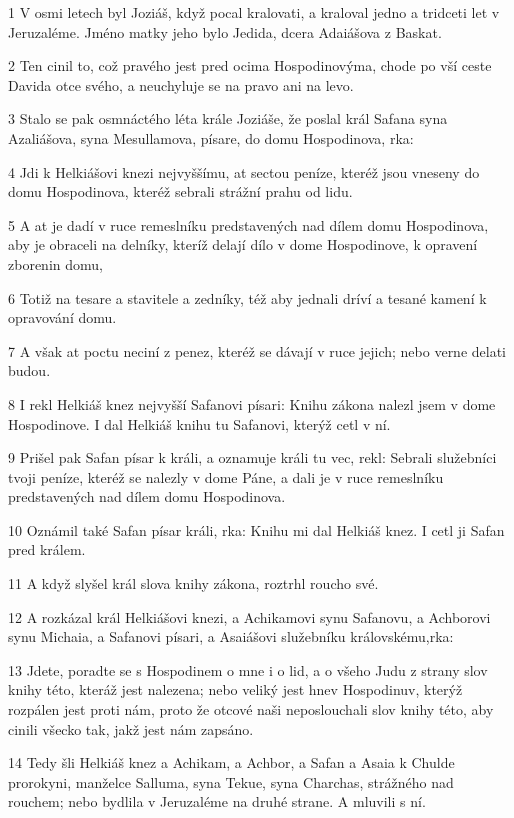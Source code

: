 \par 1 V osmi letech byl Joziáš, když pocal kralovati, a kraloval jedno a tridceti let v Jeruzaléme. Jméno matky jeho bylo Jedida, dcera Adaiášova z Baskat.
\par 2 Ten cinil to, což pravého jest pred ocima Hospodinovýma, chode po vší ceste Davida otce svého, a neuchyluje se na pravo ani na levo.
\par 3 Stalo se pak osmnáctého léta krále Joziáše, že poslal král Safana syna Azaliášova, syna Mesullamova, písare, do domu Hospodinova, rka:
\par 4 Jdi k Helkiášovi knezi nejvyššímu, at sectou peníze, kteréž jsou vneseny do domu Hospodinova, kteréž sebrali strážní prahu od lidu.
\par 5 A at je dadí v ruce remeslníku predstavených nad dílem domu Hospodinova, aby je obraceli na delníky, kteríž delají dílo v dome Hospodinove, k opravení zborenin domu,
\par 6 Totiž na tesare a stavitele a zedníky, též aby jednali dríví a tesané kamení k opravování domu.
\par 7 A však at poctu neciní z penez, kteréž se dávají v ruce jejich; nebo verne delati budou.
\par 8 I rekl Helkiáš knez nejvyšší Safanovi písari: Knihu zákona nalezl jsem v dome Hospodinove. I dal Helkiáš knihu tu Safanovi, kterýž cetl v ní.
\par 9 Prišel pak Safan písar k králi, a oznamuje králi tu vec, rekl: Sebrali služebníci tvoji peníze, kteréž se nalezly v dome Páne, a dali je v ruce remeslníku predstavených nad dílem domu Hospodinova.
\par 10 Oznámil také Safan písar králi, rka: Knihu mi dal Helkiáš knez. I cetl ji Safan pred králem.
\par 11 A když slyšel král slova knihy zákona, roztrhl roucho své.
\par 12 A rozkázal král Helkiášovi knezi, a Achikamovi synu Safanovu, a Achborovi synu Michaia, a Safanovi písari, a Asaiášovi služebníku královskému,rka:
\par 13 Jdete, poradte se s Hospodinem o mne i o lid, a o všeho Judu z strany slov knihy této, kteráž jest nalezena; nebo veliký jest hnev Hospodinuv, kterýž rozpálen jest proti nám, proto že otcové naši neposlouchali slov knihy této, aby cinili všecko tak, jakž jest nám zapsáno.
\par 14 Tedy šli Helkiáš knez a Achikam, a Achbor, a Safan a Asaia k Chulde prorokyni, manželce Salluma, syna Tekue, syna Charchas, strážného nad rouchem; nebo bydlila v Jeruzaléme na druhé strane. A mluvili s ní.
